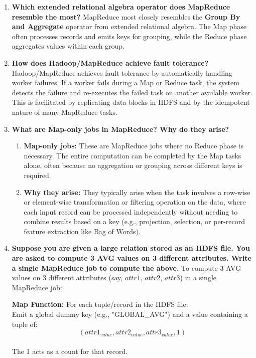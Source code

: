 \documentclass{article}
\begin{document}
\begin{enumerate}
    \item \textbf{Which extended relational algebra operator does MapReduce resemble the most?}
    MapReduce most closely resembles the \textbf{Group By and Aggregate} operator from extended relational algebra. The Map phase often processes records and emits keys for grouping, while the Reduce phase aggregates values within each group.

    \item \textbf{How does Hadoop/MapReduce achieve fault tolerance?}
    Hadoop/MapReduce achieves fault tolerance by automatically handling worker failures. If a worker fails during a Map or Reduce task, the system detects the failure and re-executes the failed task on another available worker. This is facilitated by replicating data blocks in HDFS and by the idempotent nature of many MapReduce tasks.

    \item \textbf{What are Map-only jobs in MapReduce? Why do they arise?}
    \begin{enumerate}[label=\alph*)]
        \item \textbf{Map-only jobs:} These are MapReduce jobs where no Reduce phase is necessary. The entire computation can be completed by the Map tasks alone, often because no aggregation or grouping across different keys is required.
        \item \textbf{Why they arise:} They typically arise when the task involves a row-wise or element-wise transformation or filtering operation on the data, where each input record can be processed independently without needing to combine results based on a key (e.g., projection, selection, or per-record feature extraction like Bag of Words).
    \end{enumerate}

    \item \textbf{Suppose you are given a large relation stored as an HDFS file. You are asked to compute 3 AVG values on 3 different attributes. Write a single MapReduce job to compute the above.}
    To compute 3 AVG values on 3 different attributes (say, $attr1$, $attr2$, $attr3$) in a single MapReduce job:

    \textbf{Map Function:}
    For each tuple/record in the HDFS file: \\

    Emit a global dummy key (e.g., "GLOBAL\_AVG") and a value containing a tuple of:
    $$(attr1_{value}, attr2_{value}, attr3_{value}, 1)$$\\
     The 1 acts as a count for that record.


\end{enumerate}
\end{document}
